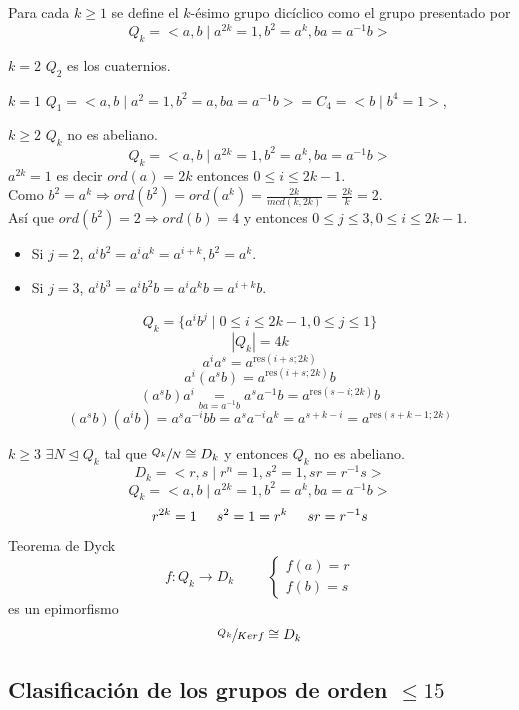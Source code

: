 \documentclass[11pt,a4paper]{article}
\begin{document}
Para cada $k \geq 1$ se define el $k$-ésimo grupo dicíclico como el grupo presentado por
$$Q_{k} = <a, b \mid a^{2k} = 1, b^{2} = a^{k}, ba = a^{-1}b>$$
\begin{enumerate*}
\item[$k=2$] $Q_{2}$ es los cuaternios.
\item[$k=1$] $Q_{1} = <a, b \mid a^{2} = 1, b^{2} = a, ba = a^{-1}b> = C_{4} = <b \mid b^{4} = 1>$,
\item[$k \geq 2$] $Q_{k}$ no es abeliano.
$$Q_{k} = <a, b \mid a^{2k} = 1, b^{2} = a^{k}, ba = a^{-1}b>$$
$a^{2k} = 1$ es decir $ord(a) = 2k$ entonces $0 \leq i \leq 2k-1$. \\
Como $b^{2} = a^{k} \Rightarrow ord(b^{2}) = ord(a^{k}) = \frac{2k}{mcd(k, 2k)} = \frac{2k}{k} = 2$. \\
Así que $ord(b^{2}) = 2 \Rightarrow ord(b) = 4$ y entonces $0 \leq j \leq 3, 0 \leq i \leq 2k - 1$.
\begin{itemize}
\item Si $j = 2$, $a^{i}b^{2} = a^{i}a^{k} = a^{i+k}, b^{2} = a^{k}$.
\item Si $j = 3$, $a^{i}b^{3} = a^{i}b^{2}b = a^{i} a^{k} b = a^{i+k} b$.
\end{itemize}
$$Q_{k} = \{a^{i} b^{j} \mid 0 \leq i \leq 2k-1, 0 \leq j \leq 1\}$$
$$|Q_{k}| = 4k$$
$$a^{i}a^{s} = a^{\text{res}(i + s; 2k)}$$
$$a^{i}(a^{s}b) = a^{\text{res}(i + s; 2k)}b$$
$$(a^{s}b) a^{i} \underset{ba = a^{-1}b}{=} a^{s}a^{-1}b = a^{\text{res}(s-i; 2k)}b$$
$$(a^{s}b)(a^{i}b) = a^{s}a^{-i}bb = a^{s}a^{-i}a^{k} = a^{s+k-i} = a^{\text{res}(s+k-1; 2k)}$$
\item[$k \geq 3$] $\exists N \unlhd Q_{k}$ tal que $\sfrac{Q_{k}}{N} \cong D_{k}$ y entonces $Q_{k}$ no es abeliano.
$$D_{k} = <r, s \mid r^{n} = 1, s^{2} = 1, sr = r^{-1}s>$$
$$Q_{k} = <a, b \mid a^{2k} = 1, b^{2} = a^{k}, ba = a^{-1}b>$$
$$r^{2k} = 1 \hspace{0.5cm} s^{2} = 1 = r^{k} \hspace{0.5cm} sr = r^{-1}s$$
Teorema de Dyck
$$f: Q_{k} \to D_{k} \hspace{1cm}
\begin{cases}
f(a) = r \\
f(b) = s
\end{cases}$$
es un epimorfismo
$$\sfrac{Q_{k}}{Kerf} \cong D_{k}$$
\end{enumerate*}


\subsection*{Clasificación de los grupos de orden $\leq 15$}
\end{document}
